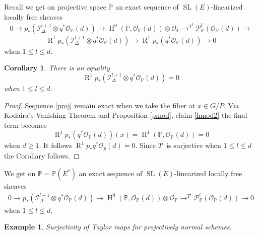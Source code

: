 \documentclass{amsart}
\theoremstyle{plain}
\newtheorem{corollary}[theorem]{Corollary}
\newtheorem{example}[theorem]{Example}
\theoremstyle{definition}
\theoremstyle{remark}
\numberwithin{equation}{theorem}
\begin{document}
Recall we get on projective space ${\mathbb{P}}$ an exact sequence of
${\operatorname{SL}}(E)$-linearized locally free sheaves
\begin{align} \label{proj} 0\rightarrow p_*({\mathcal{I}}_\Delta^{l+1}\otimes q^*{\mathcal{O} }_{\mathbb{P}}(d))\rightarrow {\operatorname{H} }^0({\mathbb{P}},
{\mathcal{O} }_{\mathbb{P}}(d))\otimes {\mathcal{O} }_{\mathbb{P}} \rightarrow^{T^l} {\mathcal{P} }^l_{\mathbb{P}}({\mathcal{O} }_{\mathbb{P}}(d))
\rightarrow \end{align}
\[ {\operatorname{R} }^1p_*({\mathcal{I}}_\Delta^{l+1}\otimes q^*{\mathcal{O} }_{\mathbb{P}}(d)) \rightarrow  {\operatorname{R} }^1p_*(q^*{\mathcal{O} }_{\mathbb{P}}(d)) \rightarrow 0\]
when $1\leq l \leq d$.

\begin{corollary}  There is an equality
\[ {\operatorname{R} }^1p_*({\mathcal{I}}_\Delta^{l+1}\otimes q^*{\mathcal{O} }_{\mathbb{P}}(d))=0 \]
when $1\leq l \leq d$.
\end{corollary}
\begin{proof} Sequence \ref{proj} remain exact when we take the fiber
  at $x\in G/P$. Via Kodaira's Vanishing Theorem and Proposition \ref{pmod}, claim \ref{hmod2}
  the final term becomes
\[ {\operatorname{R} }^1p_*(q^*{\mathcal{O} }_{\mathbb{P}}(d))(x)={\operatorname{H} }^1({\mathbb{P}}, {\mathcal{O} }_{\mathbb{P}}(d))=0 \]
when $d\geq 1$. It follows ${\operatorname{R} }^1p_*q^*{\mathcal{O} }_p(d)=0$.
Since $T^l$ is surjective when $1\leq l \leq d$ the
Corollary follows.
\end{proof}

We get on ${\mathbb{P}}={\mathbb{P}}(E^*)$ an exact sequence of ${\operatorname{SL}}(E)$-linearized locally free sheaves
\begin{align} \label{proj0} 0\rightarrow p_*({\mathcal{I}}_\Delta^{l+1}\otimes
  q^*{\mathcal{O} }_{\mathbb{P}}(d))\rightarrow {\operatorname{H} }^0({\mathbb{P}},
{\mathcal{O} }_{\mathbb{P}}(d))\otimes {\mathcal{O} }_{\mathbb{P}} \rightarrow^{T^l} {\mathcal{P} }^l_{\mathbb{P}}({\mathcal{O} }_{\mathbb{P}}(d))
\rightarrow 0 \end{align}
when $1\leq l \leq d$.

\begin{example} Surjectivity of Taylor maps for projectively normal schemes. \end{example}
\end{document}
